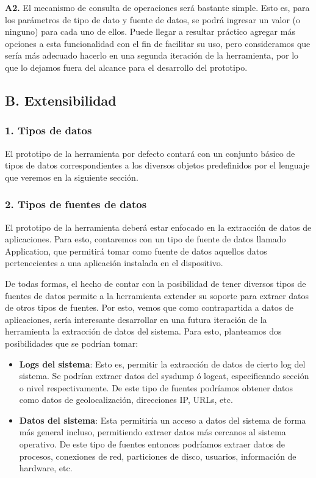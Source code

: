 \textbf{A2.} El mecanismo de consulta de operaciones será bastante simple. Esto es, para los parámetros de tipo de dato y fuente de datos, se podrá ingresar un valor (o ninguno) para cada uno de ellos. Puede llegar a resultar práctico agregar más opciones a esta funcionalidad con el fin de facilitar su uso, pero consideramos que sería más adecuado hacerlo en una segunda iteración de la herramienta, por lo que lo dejamos fuera del alcance para el desarrollo del prototipo.

\subsection*{B. Extensibilidad}
\subsubsection*{1. Tipos de datos}
El prototipo de la herramienta por defecto contará con un conjunto básico de tipos de datos correspondientes a los diversos objetos predefinidos por el lenguaje que veremos en la siguiente sección.

\subsubsection*{2. Tipos de fuentes de datos}
El prototipo de la herramienta deberá estar enfocado en la extracción de datos de aplicaciones. Para esto, contaremos con un tipo de fuente de datos llamado Application, que permitirá tomar como fuente de datos aquellos datos pertenecientes a una aplicación instalada en el dispositivo.

De todas formas, el hecho de contar con la posibilidad de tener diversos tipos de fuentes de datos permite a la herramienta extender su soporte para extraer datos de otros tipos de fuentes. Por esto, vemos que como contrapartida a datos de aplicaciones, sería interesante desarrollar en una futura iteración de la herramienta la extracción de datos del sistema. Para esto, planteamos dos posibilidades que se podrían tomar:

\begin{itemize}
\item \textbf{Logs del sistema}: Esto es, permitir la extracción de datos de cierto log del sistema. Se podrían extraer datos del sysdump ó logcat, especificando sección o nivel respectivamente. De este tipo de fuentes podríamos obtener datos como datos de geolocalización, direcciones IP, URLs, etc.
\item \textbf{Datos del sistema}: Esta permitiría un acceso a datos del sistema de forma más general incluso, permitiendo extraer datos más cercanos al sistema operativo. De este tipo de fuentes entonces podríamos extraer datos de procesos, conexiones de red, particiones de disco, usuarios, información de hardware, etc.
\end{itemize}

